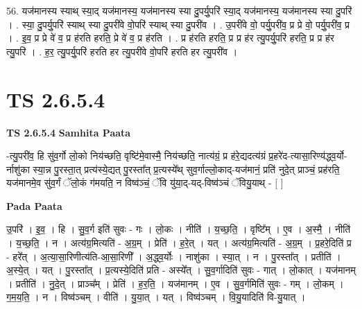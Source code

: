 \documentclass[17pt]{extarticle}
\begin{document}
56. यज॑मानस्य स्याथ् स्या॒द् यज॑मानस्य॒ यज॑मानस्य स्या दु॒पर्यु॒परि॑ स्या॒द् यज॑मानस्य॒ यज॑मानस्य स्या दु॒परि॑ । . स्या॒ दु॒पर्यु॒परि॑ स्याथ् स्या दु॒परी॑वे वो॒परि॑ स्याथ् स्या दु॒परी॑व । . उ॒परी॑वे वो॒ पर्यु॒परी॑व॒ प्र प्रे वो॒ पर्यु॒परी॑व॒ प्र । . इ॒व॒ प्र प्रे वे॑ व॒ प्र ह॑रति हरति॒ प्रे वे॑ व॒ प्र ह॑रति । . प्र ह॑रति हरति॒ प्र प्र ह॑र त्यु॒पर्यु॒परि॑ हरति॒ प्र प्र ह॑र त्यु॒परि॑ । . ह॒र॒ त्यु॒पर्यु॒परि॑ हरति हर त्यु॒परी॑वे वो॒परि॑ हरति हर त्यु॒परी॑व । \newline
\pagebreak
{}
\section*{ TS 2.6.5.4 }

\textbf{TS 2.6.5.4 } \newline
\textbf{Samhita Paata} \newline

-त्यु॒परी॑व॒ हि सु॑व॒र्गो लो॒को निय॑च्छति॒ वृष्टि॑मे॒वास्मै॒ निय॑च्छति॒ नात्य॑ग्रं॒ प्र ह॑रे॒द्यदत्य॑ग्रं प्र॒हरे॑द-त्यासा॒रिण्य॑द्ध्व॒र्यो-र्नाशु॑का स्या॒न्न पु॒रस्ता॒त् प्रत्य॑स्ये॒द्यत् पु॒रस्ता᳚त् प्र॒त्यस्ये᳚थ् सुव॒र्गाल्लो॒काद्-यज॑मानं॒ प्रति॑ नुदे॒त् प्राञ्चं॒ प्रह॑रति॒ यज॑मानमे॒व सु॑व॒र्गं ॅलो॒कं ग॑मयति॒ न विष्व॑ञ्चं॒ ॅवि यु॑या॒द्-यद्-विष्व॑ञ्चं ॅवियु॒याथ् - [  ] \newline

\textbf{Pada Paata} \newline

उ॒परि॑ । इ॒व॒ । हि । सु॒व॒र्ग इति॑ सुवः - गः । लो॒कः । नीति॑ । य॒च्छ॒ति॒ । वृष्टि᳚म् । ए॒व । अ॒स्मै॒ । नीति॑ । य॒च्छ॒ति॒ । न । अत्य॑ग्र॒मित्यति॑ - अ॒ग्र॒म् । प्रेति॑ । ह॒रे॒त् । यत् । अत्य॑ग्र॒मित्यति॑ - अ॒ग्र॒म् । प्र॒हरे॒दिति॑ प्र - हरे᳚त् । अ॒त्या॒सा॒रिणीत्य॑ति-आ॒सा॒रिणी᳚ । अ॒द्ध्व॒र्योः । नाशु॑का । स्या॒त् । न । पु॒रस्ता᳚त् । प्रतीति॑ । अ॒स्ये॒त् । यत् । पु॒रस्ता᳚त् । प्र॒त्यस्ये॒दिति॑ प्रति - अस्ये᳚त् । सु॒व॒र्गादिति॑ सुवः - गात् । लो॒कात् । यज॑मानम् । प्रतीति॑ । नु॒दे॒त् । प्राञ्च᳚म् । प्रेति॑ । ह॒र॒ति॒ । यज॑मानम् । ए॒व । सु॒व॒र्गमिति॑ सुवः - गम् । लो॒कम् । ग॒म॒य॒ति॒ । न । विष्व॑ञ्चम् । वीति॑ । यु॒या॒त् । यत् । विष्व॑ञ्चम् । वि॒यु॒यादिति॑ वि-यु॒यात् ।  \newline
\end{document}
